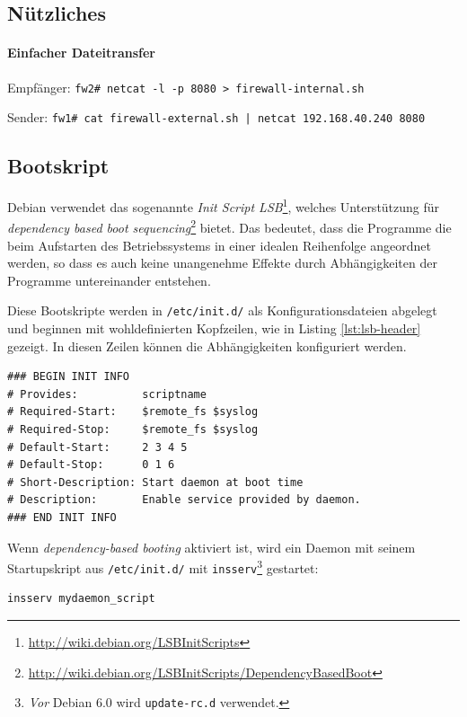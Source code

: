 \subsection{Nützliches}

\paragraph{Einfacher Dateitransfer}

Empfänger:
{\tt fw2\# netcat -l -p 8080 > firewall-internal.sh}

Sender:
{\tt fw1\# cat firewall-external.sh | netcat 192.168.40.240 8080}


\subsection{Bootskript}

Debian verwendet das sogenannte \emph{Init Script LSB}\footnote{
\url{http://wiki.debian.org/LSBInitScripts}}, welches Unterstützung
für \emph{dependency based boot sequencing}\footnote{
\url{http://wiki.debian.org/LSBInitScripts/DependencyBasedBoot}
} bietet. Das bedeutet, dass
die Programme die beim Aufstarten des Betriebssystems in einer idealen
Reihenfolge angeordnet werden, so dass es auch keine unangenehme Effekte
durch Abhängigkeiten der Programme untereinander entstehen.

Diese Bootskripte werden in {\tt /etc/init.d/} als Konfigurationsdateien
abgelegt und beginnen mit wohldefinierten Kopfzeilen, wie in Listing
\ref{lst:lsb-header} gezeigt. In diesen Zeilen können die Abhängigkeiten
konfiguriert werden.

\begin{lstlisting}[label=lst:lsb-header,caption={Init Script LSB: Kopfzeilen.}]
### BEGIN INIT INFO
# Provides:          scriptname
# Required-Start:    $remote_fs $syslog
# Required-Stop:     $remote_fs $syslog
# Default-Start:     2 3 4 5
# Default-Stop:      0 1 6
# Short-Description: Start daemon at boot time
# Description:       Enable service provided by daemon.
### END INIT INFO
\end{lstlisting}

Wenn \emph{dependency-based booting} aktiviert ist, wird ein Daemon mit seinem
Startupskript aus {\tt /etc/init.d/} mit {\tt insserv}\footnote{
\emph{Vor} Debian 6.0 wird {\tt update-rc.d} verwendet.
} gestartet:

\begin{verbatim}
insserv mydaemon_script
\end{verbatim}

